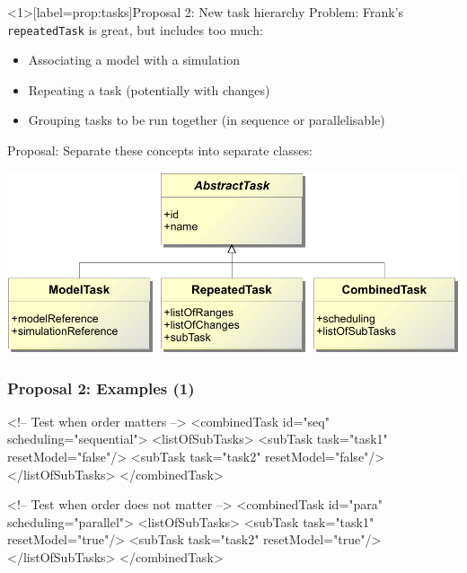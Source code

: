 \documentclass[t,xcolor={usenames,dvipsnames}]{beamer}
\newcommand{\sedml}[1]{\lstinline[basicstyle=\color{blue}]!#1!}
\begin{document}

\begin{frame}<1>[label=prop:tasks]{Proposal 2: New task hierarchy}
\alert{Problem}:
 Frank's \sedml{repeatedTask} is great, but includes too much:
\begin{itemize}
\item Associating a model with a simulation
\item Repeating a task (potentially with changes)
\item Grouping tasks to be run together (in sequence or parallelisable)
\end{itemize}

\alert{Proposal}:
 Separate these concepts into separate classes:
\begin{center}
\includegraphics[width=\textwidth]{task_uml}
\end{center}
\end{frame}


\begin{frame}[fragile=singleslide]
\frametitle{Proposal 2: Examples (1)}
\begin{blksedml}
<!-- Test when order matters -->
<combinedTask id="seq" scheduling="sequential">
    <listOfSubTasks>
        <subTask task="task1" resetModel="false"/>
        <subTask task="task2" resetModel="false"/>
    </listOfSubTasks>
</combinedTask>

<!-- Test when order does not matter -->
<combinedTask id="para" scheduling="parallel">
    <listOfSubTasks>
        <subTask task="task1" resetModel="true"/>
        <subTask task="task2" resetModel="true"/>
    </listOfSubTasks>
</combinedTask>
\end{blksedml}
\end{frame}
        
\end{document}
